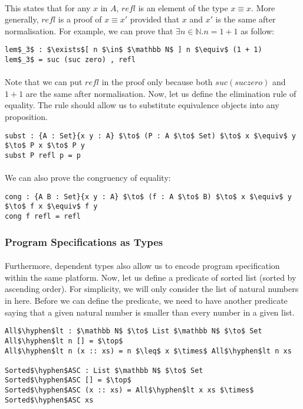\paragraph{} This states that for any \(x\) in \(A\), \(refl\) is an
element of the type \(x \equiv x\). More generally, \(refl\) is a
proof of \(x \equiv x'\) provided that \(x\) and \(x'\) is the same
after normalisation. For example, we can prove that \(\exists n\in
\mathbb N . n = 1 + 1\) as follow:
\begin{lstlisting}[mathescape=true,xleftmargin=.25\textwidth]
lem$_3$ : $\exists$[ n $\in$ $\mathbb N$ ] n $\equiv$ (1 + 1)
lem$_3$ = suc (suc zero) , refl
\end{lstlisting}

\paragraph{} Note that we can put \(refl\) in the proof only because both
\(suc (suc zero)\) and \(1 + 1\) are the same after
normalisation. Now, let us define the elimination rule of
equality. The rule should allow us to substitute equivalence objects
into any proposition. 
\begin{lstlisting}[mathescape=true,xleftmargin=.25\textwidth]
subst : {A : Set}{x y : A} $\to$ (P : A $\to$ Set) $\to$ x $\equiv$ y $\to$ P x $\to$ P y
subst P refl p = p 
\end{lstlisting}
\paragraph{} We can also prove the congruency of equality: 
\begin{lstlisting}[mathescape=true,xleftmargin=.25\textwidth]
cong : {A B : Set}{x y : A} $\to$ (f : A $\to$ B) $\to$ x $\equiv$ y $\to$ f x $\equiv$ f y
cong f refl = refl
\end{lstlisting}


\subsubsection{Program Specifications as Types}
\paragraph{} Furthermore, dependent types also allow us to encode program
specification within the same platform. Now, let us define a predicate
of sorted list (sorted by ascending order). For simplicity, we will only consider the list of
natural numbers in here. Before we can define the predicate, we need
to have another predicate saying that a given natural number is
smaller than every number in a given list. 
\begin{lstlisting}[mathescape=true,xleftmargin=.25\textwidth]
All$\hyphen$lt : $\mathbb N$ $\to$ List $\mathbb N$ $\to$ Set
All$\hyphen$lt n [] = $\top$
All$\hyphen$lt n (x :: xs) = n $\leq$ x $\times$ All$\hyphen$lt n xs

Sorted$\hyphen$ASC : List $\mathbb N$ $\to$ Set
Sorted$\hyphen$ASC [] = $\top$
Sorted$\hyphen$ASC (x :: xs) = All$\hyphen$lt x xs $\times$ Sorted$\hyphen$ASC xs
\end{lstlisting}

